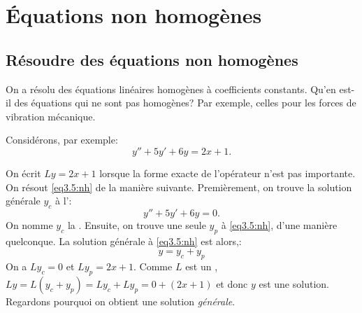 
\sectionnewpage
\section{Équations non homogènes }
\label{sec:nonhom}
%

\subsection{Résoudre des équations non homogènes }

On a résolu des équations linéaires homogènes à coefficients constants. 
Qu'en est-il des équations qui ne sont pas homogènes?
Par exemple, celles pour les forces de vibration mécanique. 


Considérons, par exemple:  
\begin{equation} \label{eq3.5:nh}
y'' + 5y'+ 6y = 2x+1 .
\end{equation}

On écrit  $Ly = 2x+1$ lorsque la forme exacte de l'opérateur n'est pas importante. 
On résout \eqref{eq3.5:nh} de la manière suivante. Premièrement, on trouve la solution générale  $y_c$
à l'\emph{}: 
\begin{equation} \label{eq3.5:h}
y'' + 5y'+ 6y = 0 .
\end{equation}
On nomme $y_c$ la \emph{}.
Ensuite, on trouve une seule \emph{} $y_p$ à \eqref{eq3.5:nh}, d'une manière quelconque.  La solution générale à \eqref{eq3.5:nh} est alors,: 
\begin{equation*}
y = y_c + y_p
\end{equation*}
On a  $L y_c = 0$ et $L y_p = 2x+1$.  Comme
$L$ est un \emph{}, $L y = L ( y_c + y_p) = L y_c + L y_p = 0
+ (2x+1)$ et donc $y$ est une solution. Regardons pourquoi on obtient une  solution  \emph{générale}.

